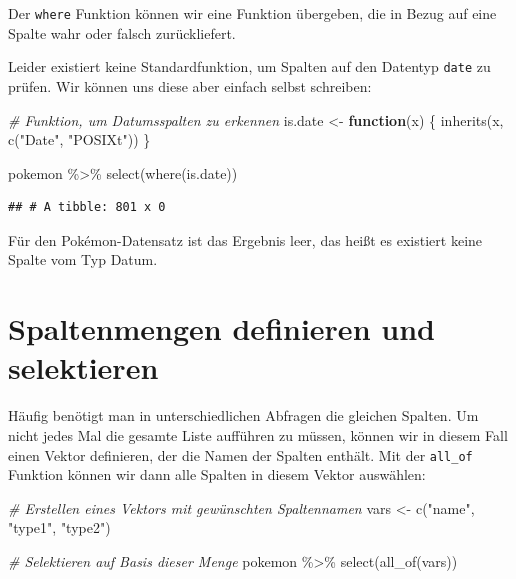 \documentclass[
]{book}
\newenvironment{Shaded}{\begin{snugshade}}{\end{snugshade}}
\newcommand{\CommentTok}[1]{\textcolor[rgb]{0.56,0.35,0.01}{\textit{#1}}}
\newcommand{\ControlFlowTok}[1]{\textcolor[rgb]{0.13,0.29,0.53}{\textbf{#1}}}
\newcommand{\FunctionTok}[1]{\textcolor[rgb]{0.00,0.00,0.00}{#1}}
\newcommand{\NormalTok}[1]{#1}
\newcommand{\OtherTok}[1]{\textcolor[rgb]{0.56,0.35,0.01}{#1}}
\newcommand{\SpecialCharTok}[1]{\textcolor[rgb]{0.00,0.00,0.00}{#1}}
\newcommand{\StringTok}[1]{\textcolor[rgb]{0.31,0.60,0.02}{#1}}
\begin{document}
Der \texttt{where} Funktion können wir eine Funktion übergeben, die in Bezug auf eine Spalte wahr oder falsch zurückliefert.

Leider existiert keine Standardfunktion, um Spalten auf den Datentyp \texttt{date} zu prüfen. Wir können uns diese aber einfach selbst schreiben:

\begin{Shaded}
\begin{Highlighting}[]
\CommentTok{\# Funktion, um Datumsspalten zu erkennen}
\NormalTok{is.date }\OtherTok{\textless{}{-}} \ControlFlowTok{function}\NormalTok{(x) \{}
  \FunctionTok{inherits}\NormalTok{(x, }\FunctionTok{c}\NormalTok{(}\StringTok{"Date"}\NormalTok{, }\StringTok{"POSIXt"}\NormalTok{))}
\NormalTok{\}}

\NormalTok{pokemon }\SpecialCharTok{\%\textgreater{}\%} 
  \FunctionTok{select}\NormalTok{(}\FunctionTok{where}\NormalTok{(is.date))}
\end{Highlighting}
\end{Shaded}

\begin{verbatim}
## # A tibble: 801 x 0
\end{verbatim}

Für den Pokémon-Datensatz ist das Ergebnis leer, das heißt es existiert keine Spalte vom Typ Datum.

\hypertarget{spaltenmengen-definieren-und-selektieren}{%
\section{Spaltenmengen definieren und selektieren}\label{spaltenmengen-definieren-und-selektieren}}

Häufig benötigt man in unterschiedlichen Abfragen die gleichen Spalten. Um nicht jedes Mal die gesamte Liste aufführen zu müssen, können wir in diesem Fall einen Vektor definieren, der die Namen der Spalten enthält. Mit der \texttt{all\_of} Funktion können wir dann alle Spalten in diesem Vektor auswählen:

\begin{Shaded}
\begin{Highlighting}[]
\CommentTok{\# Erstellen eines Vektors mit gewünschten Spaltennamen}
\NormalTok{vars }\OtherTok{\textless{}{-}} \FunctionTok{c}\NormalTok{(}\StringTok{"name"}\NormalTok{, }\StringTok{"type1"}\NormalTok{, }\StringTok{"type2"}\NormalTok{)}

\CommentTok{\# Selektieren auf Basis dieser Menge}
\NormalTok{pokemon }\SpecialCharTok{\%\textgreater{}\%}
  \FunctionTok{select}\NormalTok{(}\FunctionTok{all\_of}\NormalTok{(vars))}
\end{Highlighting}
\end{Shaded}
\end{document}

